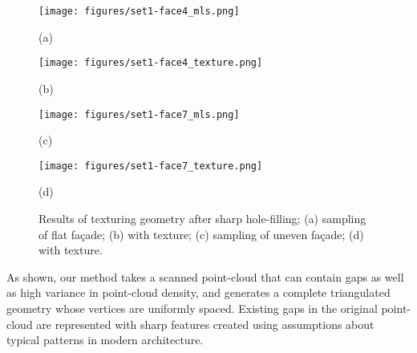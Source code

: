 \documentclass{article}
\begin{document}
\begin{figure}[t]

\begin{minipage}[b]{.48\linewidth}
  \centering
  \centerline{\texttt{[image: figures/set1-face4\_mls.png]}}
  \centerline{(a)}\medskip
\end{minipage}
\hfill
\begin{minipage}[b]{.48\linewidth}
  \centering
  \centerline{\texttt{[image: figures/set1-face4\_texture.png]}}
  \centerline{(b)}\medskip
\end{minipage}
%
\begin{minipage}[b]{.48\linewidth}
  \centering
  \centerline{\texttt{[image: figures/set1-face7\_mls.png]}}
  \centerline{(c)}\medskip
\end{minipage}
\hfill
\begin{minipage}[b]{.48\linewidth}
  \centering
  \centerline{\texttt{[image: figures/set1-face7\_texture.png]}}
  \centerline{(d)}\medskip
\end{minipage}
%
%
\caption{Results of texturing geometry after sharp hole-filling; (a) sampling of flat fa\c{c}ade; (b) with texture; (c) sampling of uneven fa\c{c}ade; (d) with texture.}
\label{fig:texture}
%
\end{figure}


As shown, our method takes a scanned point-cloud that can contain gaps as well as high variance in point-cloud density, and generates a complete triangulated geometry whose vertices are uniformly spaced.  Existing gaps in the original point-cloud are represented with sharp features created using assumptions about typical patterns in modern architecture.



\end{document}
